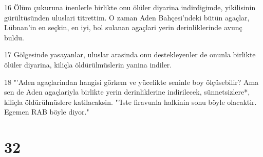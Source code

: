 \par 16 Ölüm çukuruna inenlerle birlikte onu ölüler diyarina indirdigimde, yikilisinin gürültüsünden uluslari titrettim. O zaman Aden Bahçesi'ndeki bütün agaçlar, Lübnan'in en seçkin, en iyi, bol sulanan agaçlari yerin derinliklerinde avunç buldu.
\par 17 Gölgesinde yasayanlar, uluslar arasinda onu destekleyenler de onunla birlikte ölüler diyarina, kiliçla öldürülmüslerin yanina indiler.
\par 18 "'Aden agaçlarindan hangisi görkem ve yücelikte seninle boy ölçüsebilir? Ama sen de Aden agaçlariyla birlikte yerin derinliklerine indirilecek, sünnetsizlere*, kiliçla öldürülmüslere katilacaksin. "'Iste firavunla halkinin sonu böyle olacaktir. Egemen RAB böyle diyor."

\chapter{32}

